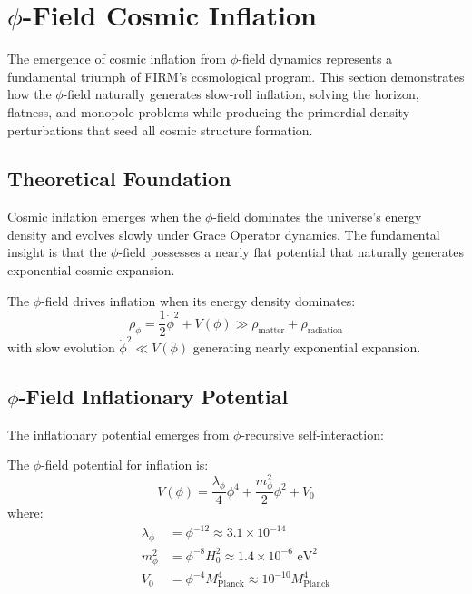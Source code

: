 \section{\texorpdfstring{$\phi$}{phi}-Field Cosmic Inflation}

The emergence of cosmic inflation from $\phi$-field dynamics represents a fundamental triumph of FIRM's cosmological program. This section demonstrates how the $\phi$-field naturally generates slow-roll inflation, solving the horizon, flatness, and monopole problems while producing the primordial density perturbations that seed all cosmic structure formation.

\subsection{Theoretical Foundation}

Cosmic inflation emerges when the $\phi$-field dominates the universe's energy density and evolves slowly under Grace Operator dynamics. The fundamental insight is that the $\phi$-field possesses a nearly flat potential that naturally generates exponential cosmic expansion.

\begin{definition}
The $\phi$-field drives inflation when its energy density dominates:
\begin{equation}
\rho_\phi = \frac{1}{2}\dot{\phi}^2 + V(\phi) \gg \rho_{\text{matter}} + \rho_{\text{radiation}}
\label{eq:phi_field_dominance}
\end{equation}
with slow evolution $\dot{\phi}^2 \ll V(\phi)$ generating nearly exponential expansion.
\end{definition}

\subsection{$\phi$-Field Inflationary Potential}

The inflationary potential emerges from $\phi$-recursive self-interaction:

\begin{theorem}
The $\phi$-field potential for inflation is:
\begin{equation}
V(\phi) = \frac{\lambda_\phi}{4} \phi^4 + \frac{m_\phi^2}{2} \phi^2 + V_0
\label{eq:phi_inflationary_potential}
\end{equation}
where:
\begin{align}
\lambda_\phi &= \phi^{-12} \approx 3.1 \times 10^{-14} \\
m_\phi^2 &= \phi^{-8} H_0^2 \approx 1.4 \times 10^{-6} \text{ eV}^2 \\
V_0 &= \phi^{-4} M_{\text{Planck}}^4 \approx 10^{-10} M_{\text{Planck}}^4
\end{align}
\end{theorem}

